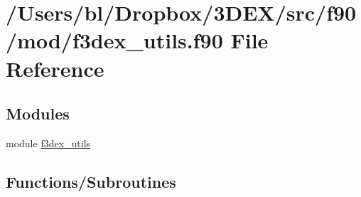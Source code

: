 \hypertarget{f3dex__utils_8f90}{
\section{/Users/bl/Dropbox/3DEX/src/f90/mod/f3dex\_\-utils.f90 File Reference}
\label{f3dex__utils_8f90}
}
\subsection*{Modules}
\begin{DoxyCompactItemize}
\item 
module \hyperlink{namespacef3dex__utils}{f3dex\_\-utils}
\end{DoxyCompactItemize}
\subsection*{Functions/Subroutines}
